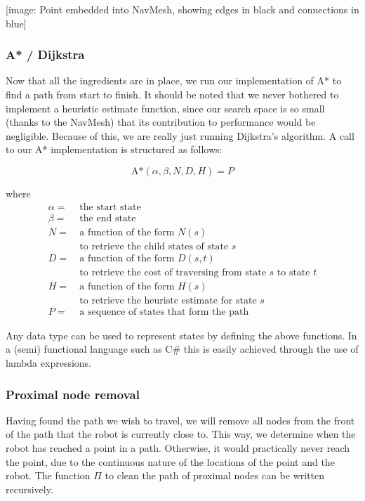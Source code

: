\documentclass[10pt,twocolumn]{scrartcl}
\begin{document}
[image: Point embedded into NavMesh, showing edges in black and connections in blue]

\subsubsection{A* / Dijkstra}

Now that all the ingredients are in place, we run our implementation of A* to find a path from start to finish. It should be noted that we never bothered to implement a heuristic estimate function, since our search space is so small (thanks to the NavMesh) that its contribution to performance would be negligible. Because of this, we are really just running Dijkstra's algorithm. A call to our A* implementation is structured as follows:

\[
\textrm{A*}(\alpha,\beta,N,D,H) = P
\]

where
\begin{align*}
\alpha =&\ \textrm{the start state} \\
\beta =&\ \textrm{the end state} \\
N =&\ \textrm{a function of the form $N(s)$} \\
&\ \textrm{to retrieve the child states of state $s$} \\
D =&\ \textrm{a function of the form $D(s,t)$} \\
&\ \textrm{to retrieve the cost of traversing from state $s$ to state $t$} \\
H =&\ \textrm{a function of the form $H(s)$} \\
&\ \textrm{to retrieve the heuristc estimate for state $s$} \\
P =&\ \textrm{a sequence of states that form the path}
\end{align*}

Any data type can be used to represent states by defining the above functions. In a (semi) functional language such as C\# this is easily achieved through the use of lambda expressions.

\subsubsection{Proximal node removal}
Having found the path we wish to travel, we will remove all nodes from the front of the path that the robot is currently close to. This way, we determine when the robot has reached a point in a path. Otherwise, it would practically never reach the point, due to the continuous nature of the locations of the point and the robot. The function $\Pi$ to clean the path of proximal nodes can be written recursively.
\end{document}
